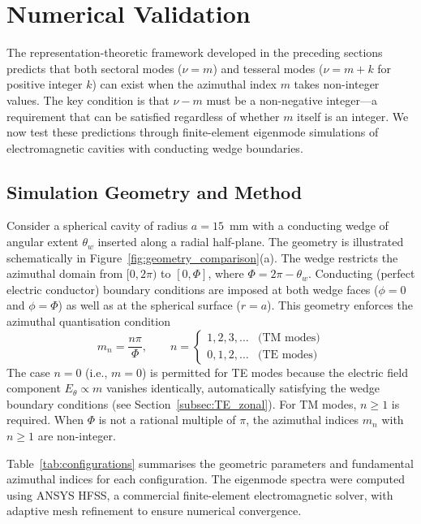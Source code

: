 \documentclass[
  aip,
  amsmath,amssymb,
  preprint
]{revtex4-1}
\begin{document}
\section{Numerical Validation}
\label{sec:numerical}

The representation-theoretic framework developed in the preceding sections predicts that both sectoral modes ($\nu = m$) and tesseral modes ($\nu = m + k$ for positive integer $k$) can exist when the azimuthal index $m$ takes non-integer values. The key condition is that $\nu - m$ must be a non-negative integer---a requirement that can be satisfied regardless of whether $m$ itself is an integer. We now test these predictions through finite-element eigenmode simulations of electromagnetic cavities with conducting wedge boundaries.

\subsection{Simulation Geometry and Method}

Consider a spherical cavity of radius $a = 15$~mm with a conducting wedge of angular extent $\theta_w$ inserted along a radial half-plane. The geometry is illustrated schematically in Figure~\ref{fig:geometry_comparison}(a). The wedge restricts the azimuthal domain from $[0, 2\pi)$ to $[0, \Phi]$, where $\Phi = 2\pi - \theta_w$. Conducting (perfect electric conductor) boundary conditions are imposed at both wedge faces ($\phi = 0$ and $\phi = \Phi$) as well as at the spherical surface ($r = a$). This geometry enforces the azimuthal quantisation condition
\begin{equation}
m_n = \frac{n\pi}{\Phi}, \qquad n = 
\begin{cases}
1, 2, 3, \ldots & \text{(TM modes)} \\
0, 1, 2, \ldots & \text{(TE modes)}
\end{cases}
\label{eq:m_quantisation}
\end{equation}
The case $n = 0$ (i.e., $m = 0$) is permitted for TE modes because the electric field component $E_\theta \propto m$ vanishes identically, automatically satisfying the wedge boundary conditions (see Section~\ref{subsec:TE_zonal}). For TM modes, $n \geq 1$ is required. When $\Phi$ is not a rational multiple of $\pi$, the azimuthal indices $m_n$ with $n \geq 1$ are non-integer.

Table~\ref{tab:configurations} summarises the geometric parameters and fundamental azimuthal indices for each configuration. The eigenmode spectra were computed using ANSYS HFSS, a commercial finite-element electromagnetic solver, with adaptive mesh refinement to ensure numerical convergence.
\end{document}
